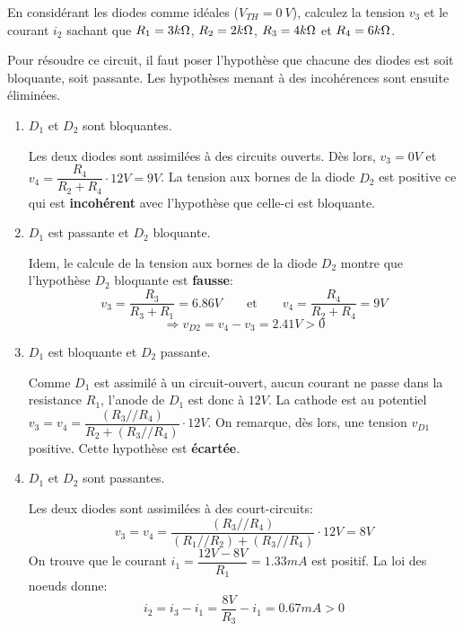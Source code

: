 \documentclass{../template/tp}
\begin{document}
\Question
{
    En considérant les diodes comme idéales ($ V_{TH} = 0~V $), calculez la tension $ v_{3} $ et le courant $ i_{2} $ sachant que $ R_{1} = 3k\ohm $, $ R_{2} = 2k\ohm $, $ R_{3} = 4k\ohm $ et $ R_{4} = 6k\ohm $.
}
{
    Pour résoudre ce circuit, il faut poser l'hypothèse que chacune des diodes est soit bloquante, soit passante. Les hypothèses menant à des incohérences sont ensuite  éliminées. 

  \begin{enumerate}
      \item $ D_{1} $ et $ D_{2} $ sont bloquantes.

      Les deux diodes sont assimilées à des circuits ouverts.
      Dès lors, $ v_{3} = 0V $ et $ v_{4} = \dfrac{ R_{4} }{ R_{2} + R_{4}} \cdot 12V = 9V$.
      La tension aux bornes de la diode $ D_{2} $ est positive ce qui est \textbf{incohérent} avec l'hypothèse que celle-ci est bloquante.

      \item $ D_{1} $ est passante et $ D_{2} $ bloquante.

      Idem, le calcule de la tension aux bornes de la diode $ D_{2} $ montre que l'hypothèse $ D_{2} $ bloquante est \textbf{fausse}:
      $$ v_{3} = \frac{ R_{3} }{ R_{3} + R_{1} } = 6.86V \qquad\text{et}\qquad  v_{4} = \frac{ R_{4} }{ R_{2} + R_{4} } = 9V $$
      $$ \Rightarrow v_{D2} = v_{4} - v_{3} = 2.41V > 0 $$

      \item $ D_{1} $ est bloquante et $ D_{2} $ passante.

      Comme $ D_{1} $ est assimilé à un circuit-ouvert, aucun courant ne passe dans la resistance $ R_{1} $, l'anode de $ D_{1} $ est donc à $ 12V $.
      La cathode est au potentiel $ v_{3} = v_{4} = \dfrac{ ( R_{3} // R_{4} ) }{ R_{2} + ( R_{3} // R_{4} ) } \cdot 12V $. 
      On remarque, dès lors, une tension $v_{D1}$ positive. 
      Cette hypothèse est \textbf{écartée}.

      \item $ D_{1} $ et $ D_{2} $ sont passantes.

       Les deux diodes sont assimilées à des court-circuits:
      $$ v_{3} = v_{4} = \dfrac{ ( R_{3} // R_{4} ) }{ ( R_{1} // R_{2} ) + ( R_{3} // R_{4} ) } \cdot 12V = \boxed{8V} $$
      On trouve que le courant $ i_{1} = \dfrac{ 12V - 8V }{ R_{1} } = 1.33mA $ est positif. La loi des noeuds donne:
      $$ i_{2} = i_{3} - i_{1} = \frac{ 8V }{ R_{3} } -i_{1} = \boxed{0.67mA} > 0 $$

  \end{enumerate}

}
\end{document}
